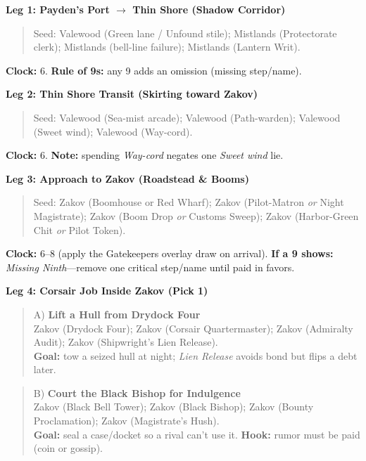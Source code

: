 \documentclass[11pt,letterpaper,twoside]{book}
\begin{document}
\textbf{Leg 1: Payden's Port $\rightarrow$ Thin Shore (Shadow Corridor)}
\begin{quote}
Seed: Valewood \spadesuit{} (Green lane / Unfound stile); Mistlands \heartsuit{} (Protectorate clerk); Mistlands \clubsuit{} (bell-line failure); Mistlands \diamondsuit{} (Lantern Writ).
\end{quote}
\textbf{Clock:} 6. \textbf{Rule of 9s:} any 9 adds an omission (missing step/name).

\textbf{Leg 2: Thin Shore Transit (Skirting toward Zakov)}
\begin{quote}
Seed: Valewood \spadesuit{} (Sea-mist arcade); Valewood \heartsuit{} (Path-warden); Valewood \clubsuit{} (Sweet wind); Valewood \diamondsuit{} (Way-cord).
\end{quote}
\textbf{Clock:} 6. \textbf{Note:} spending \emph{Way-cord} negates one \emph{Sweet wind} lie.

\textbf{Leg 3: Approach to Zakov (Roadstead \& Booms)}
\begin{quote}
Seed: Zakov \spadesuit{} (Boomhouse or Red Wharf); Zakov \heartsuit{} (Pilot-Matron \emph{or} Night Magistrate); Zakov \clubsuit{} (Boom Drop \emph{or} Customs Sweep); Zakov \diamondsuit{} (Harbor-Green Chit \emph{or} Pilot Token).
\end{quote}
\textbf{Clock:} 6--8 (apply the Gatekeepers overlay draw on arrival). \textbf{If a 9 shows:} \emph{Missing Ninth}---remove one critical step/name until paid in favors.

\textbf{Leg 4: Corsair Job Inside Zakov (Pick 1)}
\begin{quote}
A) \textbf{Lift a Hull from Drydock Four}\\
Zakov \spadesuit{} (Drydock Four); Zakov \heartsuit{} (Corsair Quartermaster); Zakov \clubsuit{} (Admiralty Audit); Zakov \diamondsuit{} (Shipwright's Lien Release).\\
\textbf{Goal:} tow a seized hull at night; \emph{Lien Release} avoids bond but flips a debt later.
\end{quote}

\begin{quote}
B) \textbf{Court the Black Bishop for Indulgence}\\
Zakov \spadesuit{} (Black Bell Tower); Zakov \heartsuit{} (Black Bishop); Zakov \clubsuit{} (Bounty Proclamation); Zakov \diamondsuit{} (Magistrate's Hush).\\
\textbf{Goal:} seal a case/docket so a rival can't use it. \textbf{Hook:} rumor must be paid (coin or gossip).
\end{quote}
\end{document}
